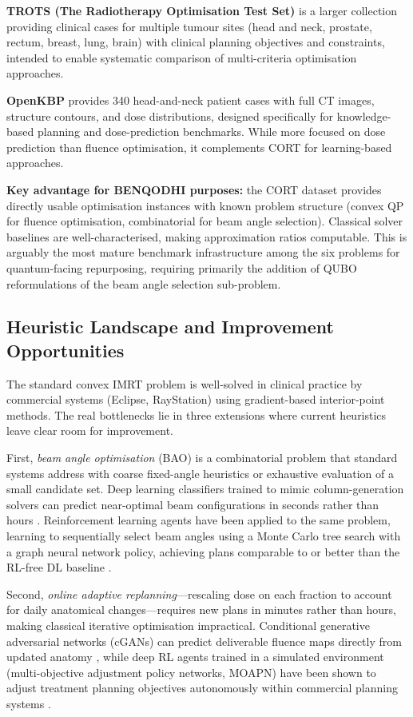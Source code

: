 \documentclass[11pt]{article}
\begin{document}
\textbf{TROTS (The Radiotherapy Optimisation Test Set)} \cite{Breedveld2017} is a larger
collection providing clinical cases for multiple tumour sites (head and neck, prostate,
rectum, breast, lung, brain) with clinical planning objectives and constraints,
intended to enable systematic comparison of multi-criteria optimisation approaches.

\textbf{OpenKBP} \cite{OpenKBP2021} provides 340 head-and-neck patient cases with
full CT images, structure contours, and dose distributions, designed specifically for
knowledge-based planning and dose-prediction benchmarks. While more focused on
dose prediction than fluence optimisation, it complements CORT for learning-based
approaches.

\textbf{Key advantage for BENQODHI purposes:} the CORT dataset provides directly
usable optimisation instances with known problem structure (convex QP for fluence
optimisation, combinatorial for beam angle selection). Classical solver baselines are
well-characterised, making approximation ratios computable. This is arguably the
most mature benchmark infrastructure among the six problems for quantum-facing
repurposing, requiring primarily the addition of QUBO reformulations of the beam
angle selection sub-problem.

\subsection*{Heuristic Landscape and Improvement Opportunities}

The standard convex IMRT problem is well-solved in clinical practice by commercial 
systems (Eclipse, RayStation) using gradient-based interior-point methods. 
The real bottlenecks lie in three extensions where current heuristics leave 
clear room for improvement.

First, \emph{beam angle optimisation} (BAO) is a combinatorial problem that standard 
systems address with coarse fixed-angle heuristics or exhaustive evaluation of a 
small candidate set. Deep learning classifiers trained to mimic column-generation 
solvers can predict near-optimal beam configurations in seconds rather than hours 
\cite{Barkousaraie2020}. Reinforcement learning agents have been applied to the same 
problem, learning to sequentially select beam angles using a Monte Carlo tree search 
with a graph neural network policy, achieving plans comparable to or better than the 
RL-free DL baseline \cite{Bao2023}.

Second, \emph{online adaptive replanning}---rescaling dose on each fraction to account 
for daily anatomical changes---requires new plans in minutes rather than hours, 
making classical iterative optimisation impractical. Conditional generative adversarial 
networks (cGANs) can predict deliverable fluence maps directly from updated anatomy 
\cite{Buchanan2023}, while deep RL agents trained in a simulated environment 
(multi-objective adjustment policy networks, MOAPN) have been shown to adjust 
treatment planning objectives autonomously within commercial planning systems \cite{MuAPNLung2023}.
\end{document}
